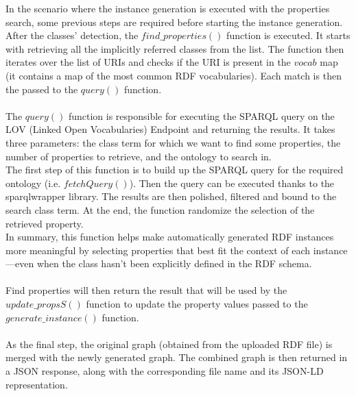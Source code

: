 In the scenario where the instance generation is executed with the properties search, some previous steps are required before starting the instance generation. 
After the classes' detection, the $find\_properties()$ function is executed. It starts with retrieving all the implicitly referred classes from the list. The function then iterates over the list of URIs and checks if the URI is present in the $vocab$ map (it contains a map of the most common RDF vocabularies). 
Each match is then the passed to the $query()$ function. 
\\
\\
The $query()$ function is responsible for executing the SPARQL query on the LOV (Linked Open Vocabularies) Endpoint and returning the results. It takes three parameters: the class term for which we want to find some properties, the number of properties to retrieve, and the ontology to search in. 
\\
The first step of this function is to build up the SPARQL query for the required ontology (i.e. $fetchQuery()$). Then the query can be executed thanks to the sparqlwrapper library. The results are then polished, filtered and bound to the search class term. At the end, the function randomize the selection of the retrieved property.
\\
In summary, this function helps make automatically generated RDF instances more meaningful by selecting properties that best fit the context of each instance—even when the class hasn’t been explicitly defined in the RDF schema.
\\
\\
Find properties will then return the result that will be used by the $update\_propsS()$ function to update the property values passed to the $generate\_instance()$ function.
\\
\\
As the final step, the original graph (obtained from the uploaded RDF file) is merged with the newly generated graph. The combined graph is then returned in a JSON response, along with the corresponding file name and its JSON-LD representation. 

